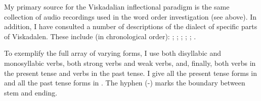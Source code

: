 \documentclass[output=paper,colorlinks,citecolor=brown,draft,draftmode]{langscibook}
\begin{document}
My primary source for the Viskadalian inflectional paradigm is the same collection of audio recordings used in the word order investigation (see  above). In addition, I have consulted a number of descriptions of the dialect of specific parts of Viskadalen. These include (in chronological order): \citet{Moller1858}; \citet{Belfrage1871}; \citet{Andersson1922}; \citet{Kalen1923}; \citet{Lindberg1927}; \citet{GotlindLandtmanson1950}.



To exemplify the full array of varying forms, I use both disyllabic and monosyllabic verbs, both strong verbs and weak verbs, and, finally, both verbs in the present tense and verbs in the past tense. I give all the present tense forms in  and all the past tense forms in . The hyphen (-) marks the boundary between stem and ending.


\begin{table}
\caption{\label{tab:petzell:2a} Viskadalian present tense inflection}
\end{table}
\end{document}

